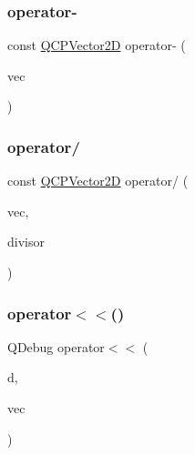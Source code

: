 \mbox{\label{class_q_c_p_vector2_d_a14c807d345ee3f22d6809bb5a4137b52}} 
\subsubsection{\texorpdfstring{operator-\/}{operator-}\hspace{0.1cm}{\footnotesize\ttfamily [2/2]}}
{\footnotesize\ttfamily const \mbox{\hyperlink{class_q_c_p_vector2_d}{Q\+C\+P\+Vector2D}} operator-\/ (\begin{DoxyParamCaption}\item[{const \mbox{\hyperlink{class_q_c_p_vector2_d}{Q\+C\+P\+Vector2D}} \&}]{vec }\end{DoxyParamCaption})\hspace{0.3cm}{\ttfamily [friend]}}

\mbox{\label{class_q_c_p_vector2_d_aa69909afc8c656999a2ea292ea01244b}} 
\subsubsection{\texorpdfstring{operator/}{operator/}}
{\footnotesize\ttfamily const \mbox{\hyperlink{class_q_c_p_vector2_d}{Q\+C\+P\+Vector2D}} operator/ (\begin{DoxyParamCaption}\item[{const \mbox{\hyperlink{class_q_c_p_vector2_d}{Q\+C\+P\+Vector2D}} \&}]{vec,  }\item[{double}]{divisor }\end{DoxyParamCaption})\hspace{0.3cm}{\ttfamily [friend]}}

\mbox{\label{class_q_c_p_vector2_d_a6c757af9671d925af4a36c2f58fb7234}} 
\subsubsection{\texorpdfstring{operator$<$$<$()}{operator<<()}}
{\footnotesize\ttfamily Q\+Debug operator$<$$<$ (\begin{DoxyParamCaption}\item[{Q\+Debug}]{d,  }\item[{const \mbox{\hyperlink{class_q_c_p_vector2_d}{Q\+C\+P\+Vector2D}} \&}]{vec }\end{DoxyParamCaption})\hspace{0.3cm}{\ttfamily [related]}}

